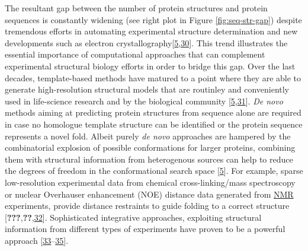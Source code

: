 \documentclass[11pt,a4paper,twoside]{book}
\theoremstyle{definition}
\theoremstyle{definition}
\theoremstyle{remark}
\begin{document}
The resultant gap between the number of protein structures and protein
sequences is constantly widening (see right plot in Figure
\ref{fig:seq-str-gap}) despite tremendous efforts in automating
experimental structure determination and new developments such as
electron
crystallography{[}\protect\hyperlink{ref-Schwede2013}{5},\protect\hyperlink{ref-Clabbers2017}{30}{]}.
This trend illustrates the essential importance of computational
approaches that can complement experimental structural biology efforts
in order to bridge this gap. Over the last decades, template-based
methods have matured to a point where they are able to generate
high-resolution structural models that are routinley and conveniently
used in life-science research and by the biological community
{[}\protect\hyperlink{ref-Schwede2013}{5},\protect\hyperlink{ref-BKC2016}{31}{]}.
\emph{De novo} methods aiming at predicting protein structures from
sequence alone are required in case no homologue template structure can
be identified or the protein sequence represents a novel fold. Albeit
purely \emph{de novo} approaches are hampered by the combinatorial
explosion of possible conformations for larger proteins, combining them
with structural information from heterogenous sources can help to reduce
the degrees of freedom in the conformational search space
{[}\protect\hyperlink{ref-Schwede2013}{5}{]}. For example, sparse
low-resolution experimental data from chemical cross-linking/mass
spectroscopy or nuclear Overhauser enhancement (NOE) distance data
generated from \protect\hyperlink{abbrev}{NMR} experiments, provide
distance restraints to guide folding to a correct structure
{[}{\textbf{???}},{\textbf{??}},\protect\hyperlink{ref-Li2004}{32}{]}.
Sophisticated integrative approaches, exploiting structural information
from different types of experiments have proven to be a powerful
approach
{[}\protect\hyperlink{ref-Ornes2016}{33}--\protect\hyperlink{ref-Tang2015}{35}{]}.
\end{document}
